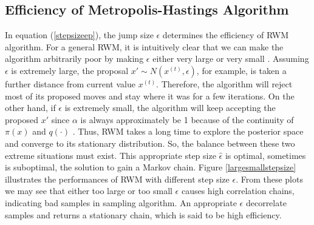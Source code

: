 



\subsection{Efficiency of Metropolis-Hastings Algorithm}\label{effMHA}

In equation (\ref{stepsizeep}), the jump size $\epsilon$ determines the efficiency of RWM algorithm. For a general RWM, it is intuitively clear that we can make the algorithm arbitrarily poor by making $\epsilon$ either very large or very small \cite{sherlock2010random}. Assuming $\epsilon$ is extremely large, the proposal $x'\sim N\left(x^{(t)},\epsilon\right)$, for example, is taken a further distance from current value $x^{(t)}$. Therefore, the algorithm will reject most of its proposed moves and stay where it was for a few iterations. On the other hand, if $\epsilon$ is extremely small, the algorithm will keep accepting the proposed $x'$ since $\alpha$ is always approximately be 1 because of the continuity of $\pi(x)$ and $q(\cdot)$ \cite{roberts2001optimal}. Thus, RWM takes a long time to explore the posterior space and converge to its stationary distribution. So, the balance between these two extreme situations must exist. This appropriate step size $\hat{\epsilon}$ is optimal, sometimes is suboptimal, the solution to gain a Markov chain. Figure \ref{largesmallstepsize} illustrates the performances of RWM with different step size $\epsilon$. From these plots we may see that either too large or too small $\epsilon$ causes high correlation chains, indicating bad samples in sampling algorithm. An appropriate $\epsilon$ decorrelate samples and returns a stationary chain, which is said to be high efficiency. 




